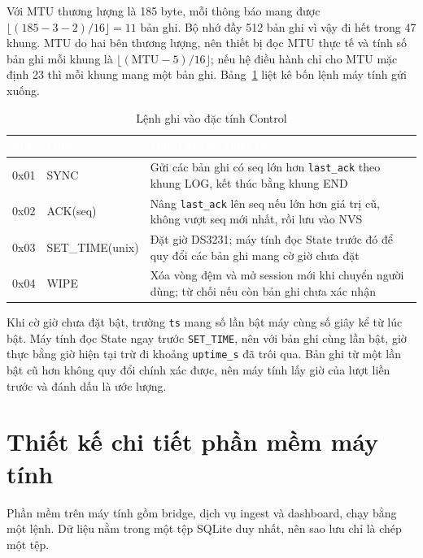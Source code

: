 Với MTU thương lượng là 185 byte, mỗi thông báo mang được $\lfloor (185 - 3 - 2) / 16 \rfloor = 11$ bản ghi. Bộ nhớ đầy 512 bản ghi vì vậy đi hết trong 47 khung. MTU do hai bên thương lượng, nên thiết bị đọc MTU thực tế và tính số bản ghi mỗi khung là $\lfloor(\text{MTU} - 5)/16\rfloor$; nếu hệ điều hành chỉ cho MTU mặc định 23 thì mỗi khung mang một bản ghi. Bảng~\ref{tab:commands} liệt kê bốn lệnh máy tính gửi xuống.

\begin{table}[H]
    \centering
    \small
    \renewcommand{\arraystretch}{1.35}
    \caption{Lệnh ghi vào đặc tính Control}
    \label{tab:commands}
    \begin{tabular}{>{\ttfamily\raggedright\arraybackslash}m{1.0cm} >{\ttfamily\raggedright\arraybackslash}m{2.6cm} >{\raggedright\arraybackslash}m{10.0cm}}
        \toprule
        \rowcolor{haitayblue}
        \textcolor{white}{Mã} & \textcolor{white}{Lệnh} & \textcolor{white}{Hành vi của thiết bị} \\
        \midrule
        \rowcolor{haitayblue!8}
        0x01 & SYNC & Gửi các bản ghi có seq lớn hơn \texttt{last\_ack} theo khung LOG, kết thúc bằng khung END \\
        0x02 & ACK(seq) & Nâng \texttt{last\_ack} lên seq nếu lớn hơn giá trị cũ, không vượt seq mới nhất, rồi lưu vào NVS \\
        \rowcolor{haitayblue!8}
        0x03 & SET\_TIME(unix) & Đặt giờ DS3231; máy tính đọc State trước đó để quy đổi các bản ghi mang cờ giờ chưa đặt \\
        0x04 & WIPE & Xóa vòng đệm và mở session mới khi chuyển người dùng; từ chối nếu còn bản ghi chưa xác nhận \\
        \bottomrule
    \end{tabular}
\end{table}

Khi cờ giờ chưa đặt bật, trường \texttt{ts} mang số lần bật máy cùng số giây kể từ lúc bật. Máy tính đọc State ngay trước \texttt{SET\_TIME}, nên với bản ghi cùng lần bật, giờ thực bằng giờ hiện tại trừ đi khoảng \texttt{uptime\_s} đã trôi qua. Bản ghi từ một lần bật cũ hơn không quy đổi chính xác được, nên máy tính lấy giờ của lượt liền trước và đánh dấu là ước lượng.

\section{Thiết kế chi tiết phần mềm máy tính}
\label{sec:pc}
Phần mềm trên máy tính gồm bridge, dịch vụ ingest và dashboard, chạy bằng một lệnh. Dữ liệu nằm trong một tệp SQLite duy nhất, nên sao lưu chỉ là chép một tệp.

